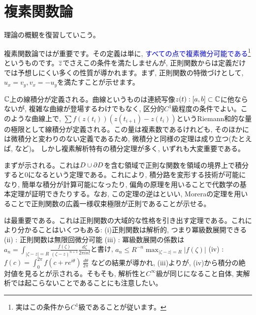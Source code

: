 \chapter{複素関数論}
理論の概観を復習していこう。
\ben
\item 複素関数論ではが重要です。その定義は単に, \textcolor{blue}{すべての点で複素微分可能である}\footnote{実はこの条件から$C^1$級であることが従います。}というものです。$\overline{z}$でさえこの条件を満たしませんが, 正則関数からは定義だけでは予想しにくい多くの性質が導かれます。まず, 正則関数の特徴づけとして, $u_x = v_y, v_x = -u_y$を満たすことが示せます。
\item $\mathbb{C}$上の線積分が定義される。曲線というものは連続写像$z(t):[a,b]\subset \mathbb{C}$に他ならないが, 複雑な曲線が登場するわけでもなく, 区分的$C^1$級程度の条件でよい。このような曲線上で, $\sum f(z(t_i)) (z(t_{i+1}) - z(t_i))$というRiemann和的な量の極限として線積分が定義される。この量は複素数であるけれども, そのほかには微積分と変わりのない定義であるため, 微積分と同様の定理は成り立つ(たとえば, など)。 しかし複素解析特有の積分定理が多く, いずれも大変重要である。
\item まずが示される。これは$D\cup \partial D$を含む領域で正則な関数を領域の境界上で積分すると0になるという定理である。これにより, 積分路を変形する技術が可能になり, 簡単な積分が計算可能になったり, 偏角の原理を用いることで代数学の基本定理が証明できたりする。なお, この定理の逆はといい, Moreraの定理を用いることで正則関数の広義一様収束極限が正則であることが示せる。
\item {}は最重要である。これは正則関数の大域的な性格を引き出す定理である。これにより分かることはいくつもある:  (i)正則関数は解析的, つまり冪級数展開できる (ii) : 正則関数は無限回微分可能 (iii) : 冪級数展開の係数は$a_n = \int_{|\zeta-z|=R} \frac{f(\zeta)}{(\zeta - z)^{n+1}}\frac{d\zeta}{2\pi i n!}$と書け, $a_n \leq R^{-n}\max_{|\zeta - z|=R}|f(\zeta)|$ (iv) :$f(c) = \int_{0}^{2\pi} f(c+re^{i\theta})\,\frac{d\theta}{2\pi}$   などの結果が導かれ, (iii)よりが, (iv)から積分の絶対値を見るとが示される。そもそも, 解析性と$C^{\infty}$級が同じになること自体, 実解析では起こらないことであることにも注意したい。
